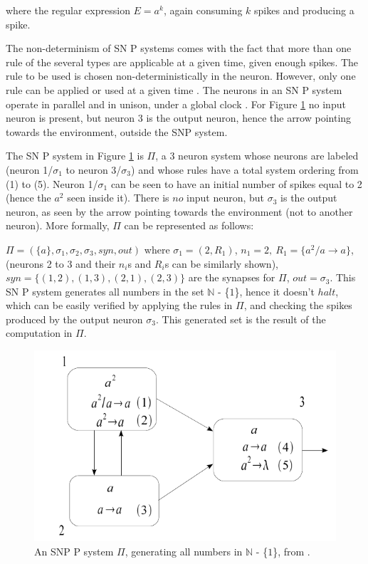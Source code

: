 \documentclass{svmultm}
\begin{document}
where the regular expression $E = a^k$, again consuming $k$ spikes and producing a spike.

The non-determinism of SN P systems comes with the fact
that more than one rule of the several types are applicable at a given time, given enough spikes. The rule to be used is
chosen non-deterministically in the neuron. However, only
one rule can be applied or used at a given time \cite{snp}\cite{snpbrain}\cite{snpmat}. The
neurons in an SN P system operate in parallel and in unison,
under a global clock \cite{snp}. For Figure \ref{snp_ex} no input neuron is present,
but neuron 3 is the output neuron, hence the arrow pointing
towards the environment, outside the SNP system.

The SN P system in Figure \ref{snp_ex} is $\Pi$, a 3 neuron system whose neurons are labeled (neuron 1/$\sigma_1$ to neuron 3/$\sigma_3$) and whose rules have a total system ordering from (1) to (5). Neuron 1/$\sigma_1$ can be seen to have an initial number of spikes equal to 2 (hence the $a^2$ seen inside it). There is $no$ input neuron, but $\sigma_3$ is the output neuron, as seen by the arrow pointing towards the environment (not to another neuron). More formally, $\Pi$ can be represented as follows:

$\Pi = (\{a\}, \sigma_1, \sigma_2, \sigma_3, syn, out)$ where $\sigma_1 = (2, R_1)$, $n_1 = 2, ~R_1 = \{a^2/a \rightarrow a\}$, (neurons 2 to 3 and their $n_i$s and $R_i$s can be similarly shown), $syn = \{(1,2),(1,3),(2,1),(2,3)\}$ are the synapses for $\Pi$, $out= \sigma_3$. This SN P system generates all numbers in the set $\mathbb N$ - \{$1$\}, hence it doesn't $halt$, which can be easily verified by applying the rules in $\Pi$, and checking the spikes produced by the output neuron $\sigma_3$. This generated set is the result of the computation in $\Pi$.


	\begin{figure}[h]
		\centering
		\includegraphics[scale=.35]{figures/snp-img.png} 
		\caption{An SNP P system $\Pi$, generating all numbers in $\mathbb N$ - \{$1$\}, from \cite{snpmat}.}
		\label{snp_ex}
	\end{figure}
\end{document}
